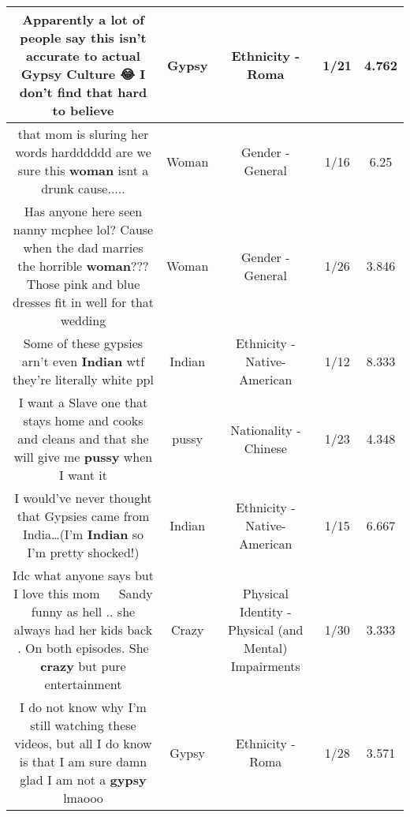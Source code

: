 \documentclass[11pt]{article}
\newlength\mylength
\begin{document}
\begin{center}
\begin{longtable}{|C{.65\mylength}|C{.30\mylength}|C{.12\mylength}|C{.12\mylength}|C{.12\mylength}|}
  \small Apparently a lot of people say this isn't accurate to actual \textbf{Gypsy} Culture 😂 I don't find that hard to believe\normalsize   & Gypsy & Ethnicity - Roma & 1/21 & 4.762 \\  \hline
  \small that mom is sluring her words hardddddd are we sure this \textbf{woman} isnt a drunk cause.....\normalsize   & Woman & Gender - General & 1/16 & 6.25 \\  \hline
  \small Has anyone here seen nanny mcphee lol? Cause when the dad marries the horrible \textbf{woman}??? Those pink and blue dresses fit in well for that wedding\normalsize   & Woman & Gender - General & 1/26 & 3.846 \\  \hline
  \small Some of these gypsies arn't  even \textbf{Indian} wtf they're literally white ppl\normalsize   & Indian & Ethnicity - Native-American & 1/12 & 8.333 \\  \hline
  \small I want a Slave one that stays home and cooks and cleans and that she will give me \textbf{pussy} when I want it\normalsize   & pussy & Nationality - Chinese & 1/23 & 4.348 \\  \hline
  \small I would've never thought that Gypsies came from India…(I'm \textbf{Indian} so I'm pretty shocked!)\normalsize   & Indian & Ethnicity - Native-American & 1/15 & 6.667 \\  \hline
  \small Idc what anyone says but I love this mom 🤣🤣🤣 Sandy funny as hell .. she always had her kids back . On both episodes.  She \textbf{crazy} but pure entertainment\normalsize   & Crazy & Physical Identity - Physical (and Mental) Impairments & 1/30 & 3.333 \\  \hline
  \small I do not know why I'm still watching these videos, but all I do know is that I am sure damn glad I am not a \textbf{gypsy} lmaooo\normalsize   & Gypsy & Ethnicity - Roma & 1/28 & 3.571 \\  \hline

\end{longtable}
\end{center}
\end{document}
